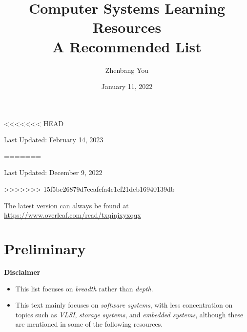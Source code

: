 \documentclass{article}
\title{\Huge{Computer Systems Learning Resources}\\ \huge{A Recommended List}}
\author{Zhenbang You}
\date{January 11, 2022}
\begin{document}
\maketitle

<<<<<<< HEAD
\centerline{\large{Last Updated: February 14, 2023}}
=======
\centerline{\large{Last Updated: December 9, 2022}}
>>>>>>> 15f5bc26879d7eeafcfa4c1cf21deb16940139db

\vspace{20pt}

The latest version can always be found at \href{https://www.overleaf.com/read/txqjnjxyxqqx}{https://www.overleaf.com/read/txqjnjxyxqqx}

\section{Preliminary}

\textbf{Disclaimer}
\begin{itemize}
    \item This list focuses on \emph{breadth} rather than \emph{depth}.
    \item This text mainly focuses on \emph{software systems}, with less concentration on topics such as \emph{VLSI}, \emph{storage systems}, and \emph{embedded systems}, although these are mentioned in some of the following resources.
\end{itemize}
\end{document}
